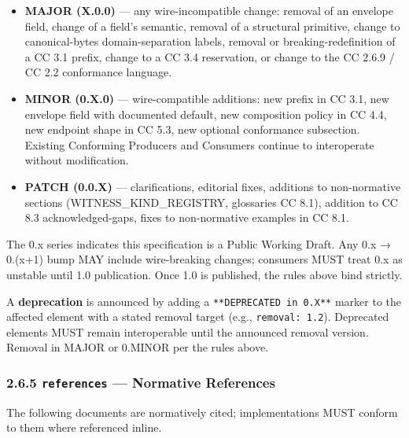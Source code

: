 \documentclass[11pt]{article}
\begin{document}
\begin{itemize}\setlength\itemsep{0pt}
\item \textbf{MAJOR (X.0.0)} — any wire-incompatible change: removal of an envelope field, change of a field's semantic, removal of a structural primitive, change to canonical-bytes domain-separation labels, removal or breaking-redefinition of a CC 3.1 prefix, change to a CC 3.4 reservation, or change to the CC 2.6.9 / CC 2.2 conformance language.
\item \textbf{MINOR (0.X.0)} — wire-compatible additions: new prefix in CC 3.1, new envelope field with documented default, new composition policy in CC 4.4, new endpoint shape in CC 5.3, new optional conformance subsection. Existing Conforming Producers and Consumers continue to interoperate without modification.
\item \textbf{PATCH (0.0.X)} — clarifications, editorial fixes, additions to non-normative sections (WITNESS\_KIND\_REGISTRY, glossaries CC 8.1), addition to CC 8.3 acknowledged-gaps, fixes to non-normative examples in CC 8.1.
\end{itemize}


The 0.x series indicates this specification is a Public Working Draft. Any 0.x → 0.(x+1) bump MAY include wire-breaking changes; consumers MUST treat 0.x as unstable until 1.0 publication. Once 1.0 is published, the rules above bind strictly.


A \textbf{deprecation} is announced by adding a \texttt{**DEPRECATED in 0.X**} marker to the affected element with a stated removal target (e.g., \texttt{removal: 1.2}). Deprecated elements MUST remain interoperable until the announced removal version. Removal in MAJOR or 0.MINOR per the rules above.


\subsubsection*{2.6.5 \texttt{references} — Normative References}


The following documents are normatively cited; implementations MUST conform to them where referenced inline.
\end{document}
